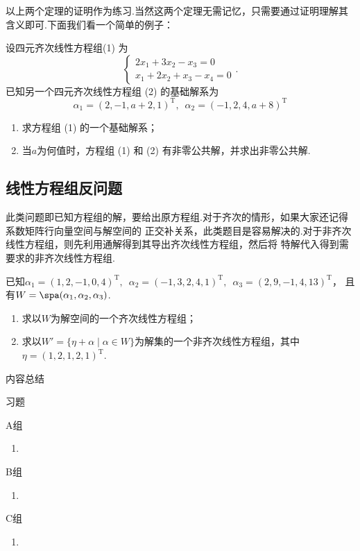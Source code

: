 以上两个定理的证明作为练习.当然这两个定理无需记忆，只需要通过证明理解其含义即可.下面我们看一个简单的例子：
\begin{example}
    设四元齐次线性方程组(1) 为$$\begin{cases}
        2x_1+3x_2-x_3=0 \\ x_1+2x_2+x_3-x_4=0
    \end{cases}.$$已知另一个四元齐次线性方程组 (2) 的基础解系为
    \[\alpha_1=(2,-1,a+2,1)^\mathrm{T},\enspace\alpha_2=(-1,2,4,a+8)^\mathrm{T}\]
    \begin{enumerate}
        \item 求方程组 (1) 的一个基础解系；

        \item 当$a$为何值时，方程组 (1) 和 (2) 有非零公共解，并求出非零公共解.
    \end{enumerate}
\end{example}

\subsection{线性方程组反问题}

此类问题即已知方程组的解，要给出原方程组.对于齐次的情形，如果大家还记得系数矩阵行向量空间与解空间的
正交补关系，此类题目是容易解决的.对于非齐次线性方程组，则先利用通解得到其导出齐次线性方程组，然后将
特解代入得到需要求的非齐次线性方程组.
\begin{example}
    已知$\alpha_1=(1,2,-1,0,4)^\mathrm{T},\enspace\alpha_2=(-1,3,2,4,1)^\mathrm{T},\enspace\alpha_3=(2,9,-1,4,13)^\mathrm{T}$，
    且有$W=\spa(\alpha_1,\alpha_2,\alpha_3)$.
    \begin{enumerate}
        \item 求以$W$为解空间的一个齐次线性方程组；

        \item 求以$W'=\{\eta+\alpha \mid \alpha\in W\}$为解集的一个非齐次线性方程组，其中$\eta=(1,2,1,2,1)^\mathrm{T}$.
    \end{enumerate}
\end{example}

\vspace{2ex}
\centerline{\heiti \Large 内容总结}

\vspace{2ex}

\centerline{\heiti \Large 习题}
\vspace{2ex}
{\kaishu }
\begin{flushright}
    \kaishu

\end{flushright}
\centerline{\heiti A组}
\begin{enumerate}
    \item
\end{enumerate}
\centerline{\heiti B组}
\begin{enumerate}
    \item
\end{enumerate}
\centerline{\heiti C组}
\begin{enumerate}
    \item
\end{enumerate}
